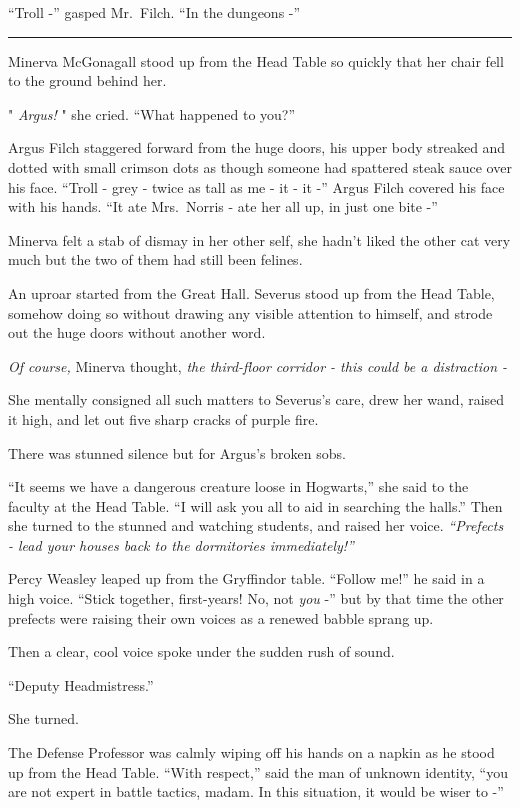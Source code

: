 ``Troll -'' gasped Mr.~Filch. ``In the dungeons -''

\begin{center}\rule{3in}{0.4pt}\end{center}

Minerva McGonagall stood up from the Head Table so quickly that her
chair fell to the ground behind her.

" \emph{Argus!} " she cried. ``What happened to you?''

Argus Filch staggered forward from the huge doors, his upper body
streaked and dotted with small crimson dots as though someone had
spattered steak sauce over his face. ``Troll - grey - twice as tall as
me - it - it -'' Argus Filch covered his face with his hands. ``It ate
Mrs.~Norris - ate her all up, in just one bite -''

Minerva felt a stab of dismay in her other self, she hadn't liked the
other cat very much but the two of them had still been felines.

An uproar started from the Great Hall. Severus stood up from the Head
Table, somehow doing so without drawing any visible attention to
himself, and strode out the huge doors without another word.

\emph{Of course,} Minerva thought, \emph{the third-floor corridor - this
could be a distraction -}

She mentally consigned all such matters to Severus's care, drew her
wand, raised it high, and let out five sharp cracks of purple fire.

There was stunned silence but for Argus's broken sobs.

``It seems we have a dangerous creature loose in Hogwarts,'' she said to
the faculty at the Head Table. ``I will ask you all to aid in searching
the halls.'' Then she turned to the stunned and watching students, and
raised her voice. \emph{``Prefects - lead your houses back to the
dormitories immediately!''}

Percy Weasley leaped up from the Gryffindor table. ``Follow me!'' he
said in a high voice. ``Stick together, first-years! No, not \emph{you}
-'' but by that time the other prefects were raising their own voices as
a renewed babble sprang up.

Then a clear, cool voice spoke under the sudden rush of sound.

``Deputy Headmistress.''

She turned.

The Defense Professor was calmly wiping off his hands on a napkin as he
stood up from the Head Table. ``With respect,'' said the man of unknown
identity, ``you are not expert in battle tactics, madam. In this
situation, it would be wiser to -''

